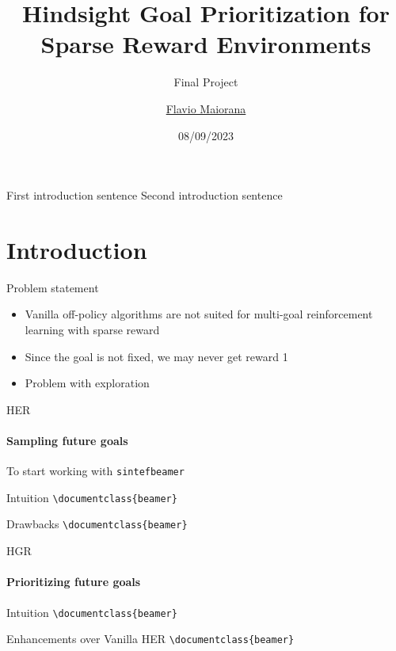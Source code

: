 \documentclass{beamer}
\title{Hindsight Goal Prioritization for Sparse Reward Environments}
\subtitle{Final Project}
\author{\href{mailto:maiorana.2051396@studenti.uniroma1.it}{Flavio Maiorana}}
\date{08/09/2023}
\begin{document}
\maketitle

\begin{frame}
      First introduction sentence
      \vspace{\baselineskip}
      Second introduction sentence
\end{frame}

\section{Introduction}

      \begin{frame}{Problem statement}
            \begin{itemize}
            \item Vanilla off-policy algorithms are not suited for multi-goal reinforcement learning with sparse reward
            \item Since the goal is not fixed, we may never get reward 1
            \item Problem with exploration
            \end{itemize}
      \end{frame}

      \begin{frame}[fragile]{HER}
            \framesubtitle{Sampling future goals}
            To start working with \texttt{sintefbeamer}
            \begin{block}{Intuition}
                  \verb|\documentclass{beamer}|\\
            \end{block}
            \begin{block}{Drawbacks}
                  \verb|\documentclass{beamer}|\\
            \end{block}
      \end{frame}

      \begin{frame}[fragile]{HGR}
            \framesubtitle{Prioritizing future goals}
            \begin{block}{Intuition}
                  \verb|\documentclass{beamer}|\\
            \end{block}
            \begin{block}{Enhancements over Vanilla HER}
                  \verb|\documentclass{beamer}|\\
            \end{block}
      \end{frame}
\end{document}
